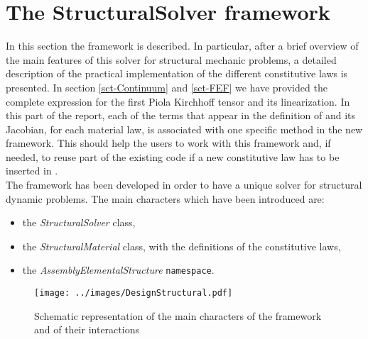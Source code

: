\section{The StructuralSolver framework}
In this section the \SSol framework is described. In particular, after a brief overview of the main features of this solver for structural mechanic problems, a detailed description of the practical implementation of the different constitutive laws is presented. In section \ref{sct-Continuum} and \ref{sct-FEF} we have provided the complete expression for the first Piola Kirchhoff tensor and its linearization. In this part of the report, each of the terms that appear in the definition of \Piola and its Jacobian, for each material law, is associated with one specific method in the new \SSolNC framework. This should help the users to work with this framework and, if needed, to reuse part of the existing code if a new constitutive law has to be inserted in \LV.\\
The \SSolNC framework has been developed in order to have a unique solver for structural dynamic problems. The main characters which have been introduced are:
\begin{itemize}
  \item the \textit{StructuralSolver} class,
  \item the \textit{StructuralMaterial} class, with the definitions of the constitutive laws,
  \item the \textit{AssemblyElementalStructure} \texttt{namespace}.
\end{itemize}

\begin{figure}[h!]
  \centering
  \texttt{[image: ../images/DesignStructural.pdf]}
  \caption{Schematic representation of the main characters of the \SSol framework and of their interactions}
  \label{fig::design}
\end{figure}
